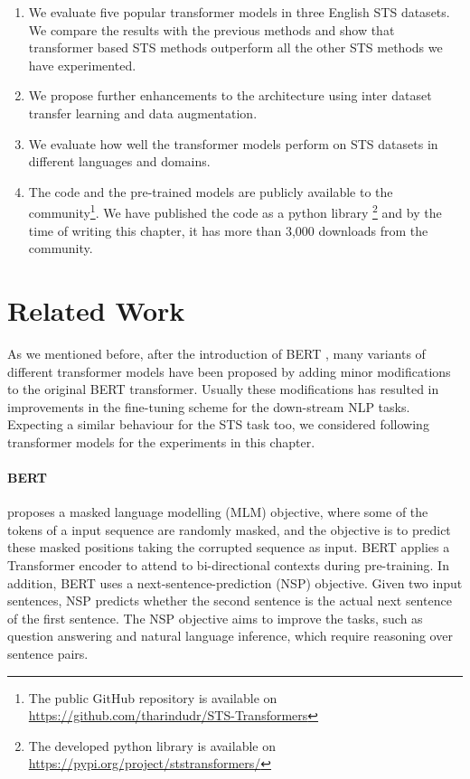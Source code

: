 \begin{enumerate}
\item We evaluate five popular transformer models in three English STS datasets. We compare the results with the previous methods and show that transformer based STS methods outperform all the other STS methods we have experimented.

\item We propose further enhancements to the architecture using inter dataset transfer learning and data augmentation.  

\item We evaluate how well the transformer models perform on STS datasets in different languages and domains. 

\item The code and the pre-trained models are publicly available to the community\footnote{The public GitHub repository is available on \url{https://github.com/tharindudr/STS-Transformers}}. We have published the code as a python library \footnote{The developed python library is available on \url{https://pypi.org/project/ststransformers/}} and by the time of writing this chapter, it has more than 3,000 downloads from the community. 

\end{enumerate}

\section{Related Work}
As we mentioned before, after the introduction of BERT \cite{devlin-etal-2019-bert}, many variants of different transformer models have been proposed by adding minor modifications to the original BERT transformer. Usually these modifications has resulted in improvements in the fine-tuning scheme for the down-stream NLP tasks. Expecting a similar behaviour for the STS task too, we considered following transformer models for the experiments in this chapter.

\paragraph{BERT} \cite{devlin-etal-2019-bert} proposes a masked language modelling (MLM) objective, where some of the tokens of a input sequence are randomly masked, and the objective is to predict these masked positions taking the corrupted sequence as input. BERT applies a Transformer encoder to attend to bi-directional contexts during pre-training. In addition, BERT uses a next-sentence-prediction (NSP) objective. Given two input sentences, NSP predicts whether the second sentence is the actual next sentence of the first sentence. The NSP objective aims to improve the tasks, such as question answering and natural language inference, which require reasoning over sentence pairs. 

